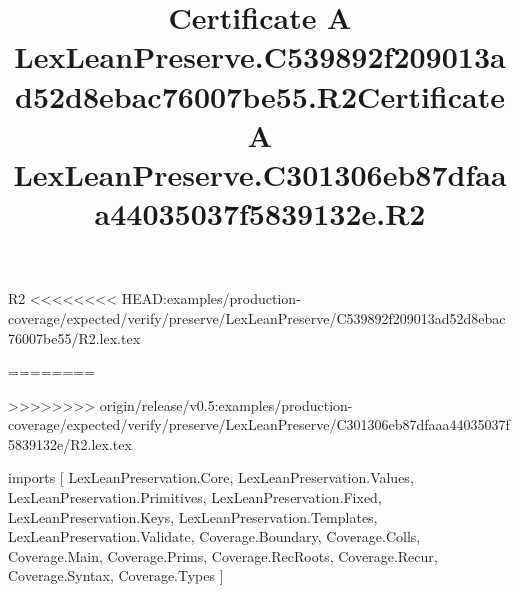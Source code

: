 \begin{lexlean}{R2}
<<<<<<<< HEAD:examples/production-coverage/expected/verify/preserve/LexLeanPreserve/C539892f209013ad52d8ebac76007be55/R2.lex.tex
\title{Certificate A LexLeanPreserve.C539892f209013ad52d8ebac76007be55.R2}
========
\title{Certificate A LexLeanPreserve.C301306eb87dfaaa44035037f5839132e.R2}
>>>>>>>> origin/release/v0.5:examples/production-coverage/expected/verify/preserve/LexLeanPreserve/C301306eb87dfaaa44035037f5839132e/R2.lex.tex
\begin{coremodule}
imports [
  LexLeanPreservation.Core,
  LexLeanPreservation.Values,
  LexLeanPreservation.Primitives,
  LexLeanPreservation.Fixed,
  LexLeanPreservation.Keys,
  LexLeanPreservation.Templates,
  LexLeanPreservation.Validate,
  Coverage.Boundary,
  Coverage.Colls,
  Coverage.Main,
  Coverage.Prims,
  Coverage.RecRoots,
  Coverage.Recur,
  Coverage.Syntax,
  Coverage.Types
]


\end{coremodule}
\end{lexlean}
